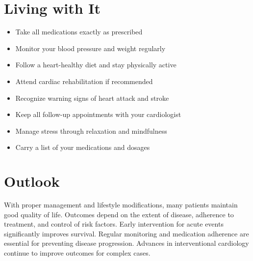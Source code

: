 \section{Living with It}
\begin{itemize}[noitemsep]
  \item Take all medications exactly as prescribed
  \item Monitor your blood pressure and weight regularly
  \item Follow a heart-healthy diet and stay physically active
  \item Attend cardiac rehabilitation if recommended
  \item Recognize warning signs of heart attack and stroke
  \item Keep all follow-up appointments with your cardiologist
  \item Manage stress through relaxation and mindfulness
  \item Carry a list of your medications and dosages
\end{itemize}
\section{Outlook}
With proper management and lifestyle modifications, many patients maintain good quality of life. Outcomes depend on the extent of disease, adherence to treatment, and control of risk factors. Early intervention for acute events significantly improves survival. Regular monitoring and medication adherence are essential for preventing disease progression. Advances in interventional cardiology continue to improve outcomes for complex cases.
